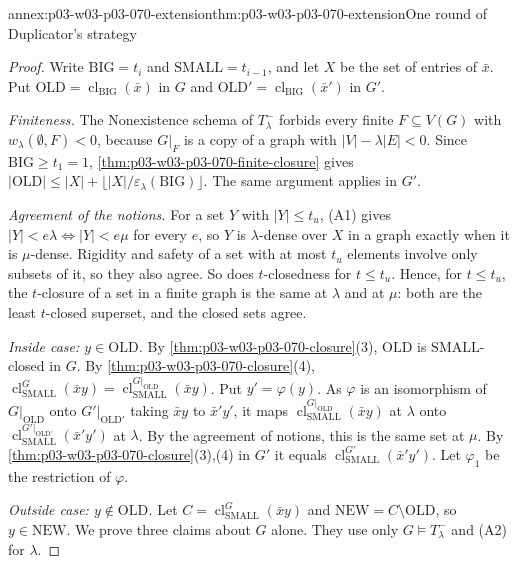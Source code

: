 \begin{annexitem}{annex:p03-w03-p03-070-extension}{thm:p03-w03-p03-070-extension}{One round of Duplicator's strategy}
\begin{proof}
Write \(\mathrm{BIG}=t_i\) and \(\mathrm{SMALL}=t_{i-1}\), and let
\(X\) be the set of entries of \(\bar x\).  Put
\(\mathrm{OLD}=\operatorname{cl}_{\mathrm{BIG}}(\bar x)\) in \(G\) and
\(\mathrm{OLD}'=\operatorname{cl}_{\mathrm{BIG}}(\bar x')\) in \(G'\).

\emph{Finiteness.}  The Nonexistence schema of \(T^-_\lambda\) forbids every
finite \(F\subseteq V(G)\) with \(w_\lambda(\emptyset,F)<0\), because
\(G|_F\) is a copy of a graph with \(|V|-\lambda|E|<0\).  Since
\(\mathrm{BIG}\geq t_1=1\), \cref{thm:p03-w03-p03-070-finite-closure} gives
\(|\mathrm{OLD}|\leq|X|+\lfloor|X|/\varepsilon_\lambda(\mathrm{BIG})\rfloor\).
The same argument applies in \(G'\).

\emph{Agreement of the notions.}  For a set \(Y\) with \(|Y|\leq t_u\), (A1)
gives \(|Y|<e\lambda\iff|Y|<e\mu\) for every \(e\), so \(Y\) is
\(\lambda\)-dense over \(X\) in a graph exactly when it is \(\mu\)-dense.
Rigidity and safety of a set with at most \(t_u\) elements involve only
subsets of it, so they also agree.  So does \(t\)-closedness for
\(t\leq t_u\).  Hence, for \(t\leq t_u\), the \(t\)-closure of a set in a
finite graph is the same at \(\lambda\) and at \(\mu\): both are the least
\(t\)-closed superset, and the closed sets agree.

\emph{Inside case: \(y\in\mathrm{OLD}\).}  By
\cref{thm:p03-w03-p03-070-closure}(3), \(\mathrm{OLD}\) is
\(\mathrm{SMALL}\)-closed in \(G\).  By
\cref{thm:p03-w03-p03-070-closure}(4),
\(\operatorname{cl}^G_{\mathrm{SMALL}}(\bar xy)=
\operatorname{cl}^{G|_{\mathrm{OLD}}}_{\mathrm{SMALL}}(\bar xy)\).  Put
\(y'=\varphi(y)\).  As \(\varphi\) is an isomorphism of
\(G|_{\mathrm{OLD}}\) onto \(G'|_{\mathrm{OLD}'}\) taking \(\bar xy\) to
\(\bar x'y'\), it maps
\(\operatorname{cl}^{G|_{\mathrm{OLD}}}_{\mathrm{SMALL}}(\bar xy)\) at \(\lambda\)
onto \(\operatorname{cl}^{G'|_{\mathrm{OLD}'}}_{\mathrm{SMALL}}(\bar x'y')\) at
\(\lambda\).  By the agreement of notions, this is the same set at \(\mu\).
By \cref{thm:p03-w03-p03-070-closure}(3),(4) in \(G'\) it equals
\(\operatorname{cl}^{G'}_{\mathrm{SMALL}}(\bar x'y')\).  Let \(\varphi_1\) be
the restriction of \(\varphi\).

\emph{Outside case: \(y\notin\mathrm{OLD}\).}  Let
\(C=\operatorname{cl}^G_{\mathrm{SMALL}}(\bar xy)\) and
\(\mathrm{NEW}=C\setminus\mathrm{OLD}\), so \(y\in\mathrm{NEW}\).  We prove
three claims about \(G\) alone.  They use only \(G\models T^-_\lambda\) and
(A2) for \(\lambda\).


\end{proof}
\end{annexitem}
